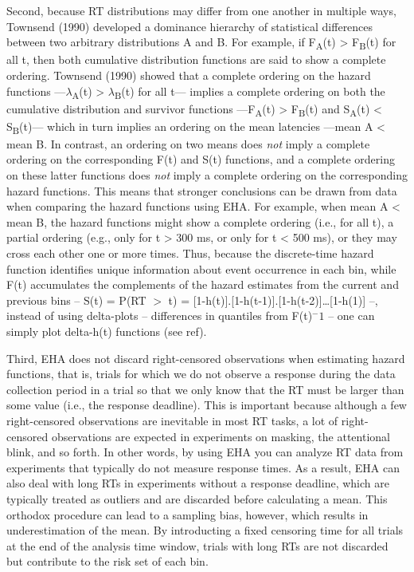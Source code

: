 \documentclass[
  man,floatsintext]{apa6}
\begin{document}
Second, because RT distributions may differ from one another in multiple ways, Townsend (1990) developed a dominance hierarchy of statistical differences between two arbitrary distributions A and B. For example, if F\textsubscript{A}(t) \textgreater{} F\textsubscript{B}(t) for all t, then both cumulative distribution functions are said to show a complete ordering. Townsend (1990) showed that a complete ordering on the hazard functions ---\(\lambda\)\textsubscript{A}(t) \textgreater{} \(\lambda\)\textsubscript{B}(t) for all t--- implies a complete ordering on both the cumulative distribution and survivor functions ---F\textsubscript{A}(t) \textgreater{} F\textsubscript{B}(t) and S\textsubscript{A}(t) \textless{} S\textsubscript{B}(t)--- which in turn implies an ordering on the mean latencies ---mean A \textless{} mean B. In contrast, an ordering on two means does \emph{not} imply a complete ordering on the corresponding F(t) and S(t) functions, and a complete ordering on these latter functions does \emph{not} imply a complete ordering on the corresponding hazard functions. This means that stronger conclusions can be drawn from data when comparing the hazard functions using EHA. For example, when mean A \textless{} mean B, the hazard functions might show a complete ordering (i.e., for all t), a partial ordering (e.g., only for t \textgreater{} 300 ms, or only for t \textless{} 500 ms), or they may cross each other one or more times.
Thus, because the discrete-time hazard function identifies unique information about event occurrence in each bin, while F(t) accumulates the complements of the hazard estimates from the current and previous bins -- S(t) = P(RT \(>\) t) = {[}1-h(t){]}.{[}1-h(t-1){]}.{[}1-h(t-2){]}\ldots{[}1-h(1){]} --, instead of using delta-plots -- differences in quantiles from F(t)\(^-1\) -- one can simply plot delta-h(t) functions (see ref).

Third, EHA does not discard right-censored observations when estimating hazard functions, that is, trials for which we do not observe a response during the data collection period in a trial so that we only know that the RT must be larger than some value (i.e., the response deadline). This is important because although a few right-censored observations are inevitable in most RT tasks, a lot of right-censored observations are expected in experiments on masking, the attentional blink, and so forth. In other words, by using EHA you can analyze RT data from experiments that typically do not measure response times. As a result, EHA can also deal with long RTs in experiments without a response deadline, which are typically treated as outliers and are discarded before calculating a mean. This orthodox procedure can lead to a sampling bias, however, which results in underestimation of the mean. By introducting a fixed censoring time for all trials at the end of the analysis time window, trials with long RTs are not discarded but contribute to the risk set of each bin.
\end{document}
